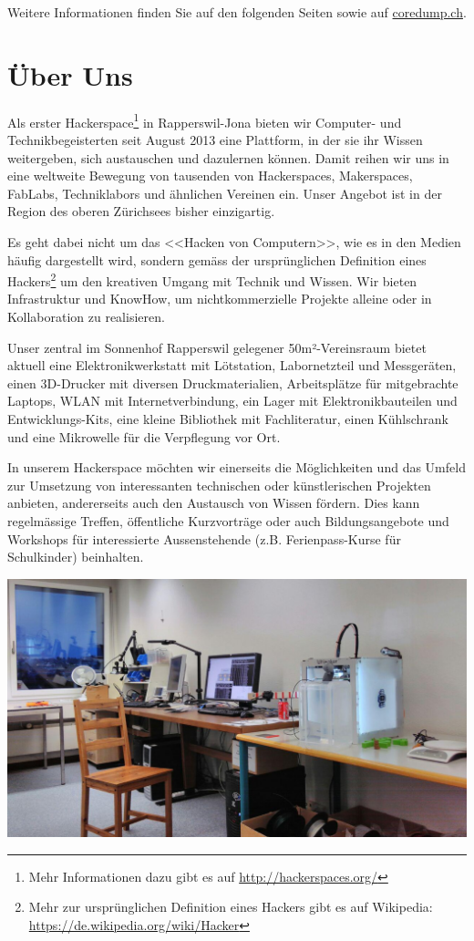 \documentclass[10pt,a4paper,parskip,fleqn]{scrartcl}
\begin{document}
Weitere Informationen finden Sie auf den folgenden Seiten sowie auf
\url{coredump.ch}.

\newpage

\section{Über Uns}

Als erster Hackerspace\footnote{Mehr Informationen dazu gibt es auf
\url{http://hackerspaces.org/}} in Rapperswil-Jona bieten wir Computer- und
Technikbegeisterten seit August 2013 eine Plattform, in der sie ihr Wissen
weitergeben, sich austauschen und dazulernen können. Damit reihen wir uns in
eine weltweite Bewegung von tausenden von Hackerspaces, Makerspaces, FabLabs,
Techniklabors und ähnlichen Vereinen ein. Unser Angebot ist in der Region des
oberen Zürichsees bisher einzigartig.

Es geht dabei nicht um das <<Hacken von Computern>>, wie es in den Medien häufig
dargestellt wird, sondern gemäss der ursprünglichen Definition eines
Hackers\footnote{Mehr zur ursprünglichen Definition eines Hackers gibt es auf
Wikipedia: \url{https://de.wikipedia.org/wiki/Hacker}} um den kreativen Umgang
mit Technik und Wissen. Wir bieten Infrastruktur und KnowHow, um
nichtkommerzielle Projekte alleine oder in Kollaboration zu realisieren.

Unser zentral im Sonnenhof Rapperswil gelegener 50m²-Vereinsraum bietet aktuell
eine Elektronikwerkstatt mit Lötstation, Labornetzteil und Messgeräten, einen
3D-Drucker mit diversen Druckmaterialien, Arbeitsplätze für mitgebrachte
Laptops, WLAN mit Internetverbindung, ein Lager mit Elektronikbauteilen und
Entwicklungs-Kits, eine kleine Bibliothek mit Fachliteratur, einen Kühlschrank
und eine Mikrowelle für die Verpflegung vor Ort.

In unserem Hackerspace möchten wir einerseits die Möglichkeiten und das Umfeld
zur Umsetzung von interessanten technischen oder künstlerischen Projekten
anbieten, andererseits auch den Austausch von Wissen fördern. Dies kann
regelmässige Treffen, öffentliche Kurzvorträge oder auch Bildungsangebote und
Workshops für interessierte Aussenstehende (z.B. Ferienpass-Kurse für
Schulkinder) beinhalten.

\includegraphics[width=\textwidth]{raum.jpg}
\end{document}
